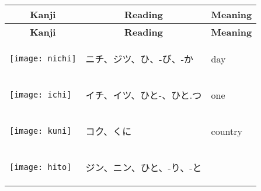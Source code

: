 \documentclass[a4paper,12pt]{extarticle}
\begin{document}
\begin{longtable}{|lp{6cm}p{4cm}|}
        \multicolumn{1}{c}{\textbf{Kanji}} & \multicolumn{1}{c}{\textbf{Reading}} & \multicolumn{1}{c}{\textbf{Meaning}} \\ \hline
        \endfirsthead

        \multicolumn{1}{c}{\textbf{Kanji}} & \multicolumn{1}{c}{\textbf{Reading}} & \multicolumn{1}{c}{\textbf{Meaning}} \\ \hline
        \endhead

        \hline
        \endfoot

        \hline \hline
        \endlastfoot

\begin{minipage}{0.3\textwidth}
\centerline{
	\texttt{[image: nichi]}
}
\end{minipage}
&
\begin{CJK}{UTF8}{min}ニチ、ジツ、ひ、-び、-か\end{CJK}
&
day
\\ 
\begin{minipage}{0.3\textwidth}
\centerline{
	\texttt{[image: ichi]}
}
\end{minipage}
&
\begin{CJK}{UTF8}{min}イチ、イツ、ひと-、ひと.つ\end{CJK}
&
one
\\ 
\begin{minipage}{0.3\textwidth}
\centerline{
	\texttt{[image: kuni]}
}
\end{minipage}
&
\begin{CJK}{UTF8}{min}コク、くに\end{CJK}
&
country
\\ 
\begin{minipage}{0.3\textwidth}
\centerline{
	\texttt{[image: hito]}
}
\end{minipage}
&
\begin{CJK}{UTF8}{min}ジン、ニン、ひと、-り、-と\end{CJK}

\end{longtable}
\end{document}
